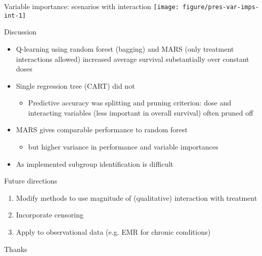 \documentclass[handout]{beamer}
\begin{document}
\begin{frame}[c]{Variable importance: scenarios with interaction}
  \centering
  \texttt{[image: figure/pres-var-imps-int-1]} 
\end{frame}


\begin{frame}[t]{Discussion}
  \begin{itemize}[<+->]
    \item Q-learning using random forest (bagging) and MARS (only treatment interactions allowed) increased average survival substantially over constant doses
    \item Single regression tree (CART) did not
    \begin{itemize}
      \item Predictive accuracy was splitting and pruning criterion: dose and interacting variables (less important in overall survival) often pruned off 
    \end{itemize}
    \item MARS gives comparable performance to random forest
    \begin{itemize}
      \item but higher variance in performance and variable importances
    \end{itemize} 
    \item As implemented subgroup identification is difficult
  \end{itemize}
\end{frame}

\begin{frame}[c]{Future directions}
  \begin{enumerate}[<+->]
    \item Modify methods to use magnitude of (qualitative) interaction with treatment
    
    \bigskip
    
    \item Incorporate censoring
    
    \bigskip
    
    \item Apply to observational data (e.g. EMR for chronic conditions)
  \end{enumerate}
\end{frame}



\begin{frame}[standout]
  Thanks
\end{frame}
\end{document}
